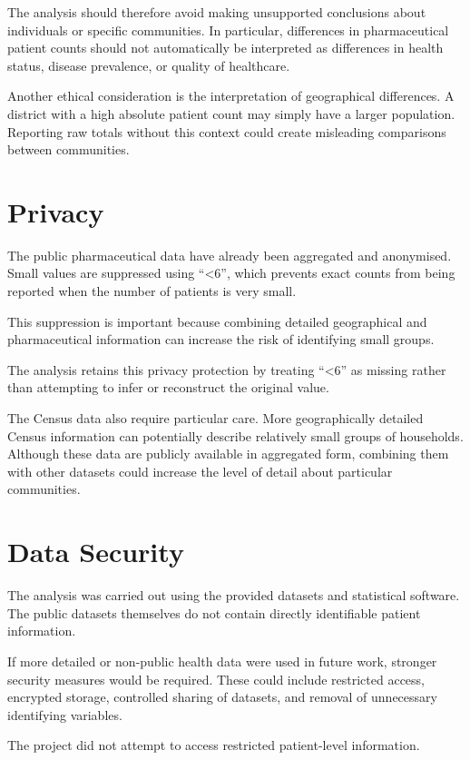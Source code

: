 \documentclass[11pt,a4paper]{report}
\begin{document}
The analysis should therefore avoid making unsupported conclusions about individuals or specific communities. In particular, differences in pharmaceutical patient counts should not automatically be interpreted as differences in health status, disease prevalence, or quality of healthcare.

Another ethical consideration is the interpretation of geographical differences. A district with a high absolute patient count may simply have a larger population. Reporting raw totals without this context could create misleading comparisons between communities.


\section{Privacy}

The public pharmaceutical data have already been aggregated and anonymised. Small values are suppressed using ``<6'', which prevents exact counts from being reported when the number of patients is very small.

This suppression is important because combining detailed geographical and pharmaceutical information can increase the risk of identifying small groups.

The analysis retains this privacy protection by treating ``<6'' as missing rather than attempting to infer or reconstruct the original value.

The Census data also require particular care. More geographically detailed Census information can potentially describe relatively small groups of households. Although these data are publicly available in aggregated form, combining them with other datasets could increase the level of detail about particular communities.


\section{Data Security}

The analysis was carried out using the provided datasets and statistical software. The public datasets themselves do not contain directly identifiable patient information.

If more detailed or non-public health data were used in future work, stronger security measures would be required. These could include restricted access, encrypted storage, controlled sharing of datasets, and removal of unnecessary identifying variables.

The project did not attempt to access restricted patient-level information.
\end{document}
